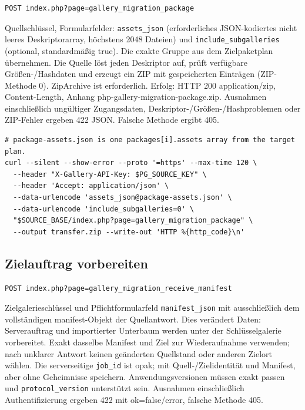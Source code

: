 \documentclass[11pt,a4paper]{article}
\newcommand{\codeword}[1]{\nolinkurl{#1}}
\begin{document}
\label{api352:migration-package}

\begin{lstlisting}[language={}]
POST index.php?page=gallery_migration_package
\end{lstlisting}

Quellschlüssel, Formularfelder: \codeword{assets_json} (erforderliches JSON-kodiertes nicht
leeres Deskriptorarray, höchstens 2048 Dateien) und \codeword{include_subgalleries}
(optional, standardmäßig true). Die exakte Gruppe aus dem Zielpaketplan übernehmen. Die
Quelle löst jeden Deskriptor auf, prüft verfügbare Größen-/Hashdaten und erzeugt ein ZIP mit
gespeicherten Einträgen (ZIP-Methode 0). ZipArchive ist erforderlich. Erfolg: HTTP 200
application/zip, Content-Length, Anhang php-gallery-migration-package.zip. Ausnahmen
einschließlich ungültiger Zugangsdaten, Deskriptor-/Größen-/Hashproblemen oder ZIP-Fehler
ergeben 422 JSON. Falsche Methode ergibt 405.

\begin{lstlisting}[language={}]
# package-assets.json is one packages[i].assets array from the target plan.
curl --silent --show-error --proto '=https' --max-time 120 \
  --header "X-Gallery-API-Key: $PG_SOURCE_KEY" \
  --header 'Accept: application/json' \
  --data-urlencode 'assets_json@package-assets.json' \
  --data-urlencode 'include_subgalleries=0' \
  "$SOURCE_BASE/index.php?page=gallery_migration_package" \
  --output transfer.zip --write-out 'HTTP %{http_code}\n'
\end{lstlisting}

\subsection{\texorpdfstring{Zielauftrag vorbereiten}{Zielauftrag vorbereiten}}

\label{api352:migration-receive-manifest}

\begin{lstlisting}[language={}]
POST index.php?page=gallery_migration_receive_manifest
\end{lstlisting}

Zielgalerieschlüssel und Pflichtformularfeld \codeword{manifest_json} mit ausschließlich dem
vollständigen manifest-Objekt der Quellantwort. Dies verändert Daten: Serverauftrag und
importierter Unterbaum werden unter der Schlüsselgalerie vorbereitet. Exakt dasselbe
Manifest und Ziel zur Wiederaufnahme verwenden; nach unklarer Antwort keinen geänderten
Quellstand oder anderen Zielort wählen. Die serverseitige \codeword{job_id} ist opak; mit
Quell-/Zielidentität und Manifest, aber ohne Geheimnisse speichern. Anwendungsversionen
müssen exakt passen und \codeword{protocol_version} unterstützt sein. Ausnahmen
einschließlich Authentifizierung ergeben 422 mit ok=false/error, falsche Methode 405.
\end{document}
